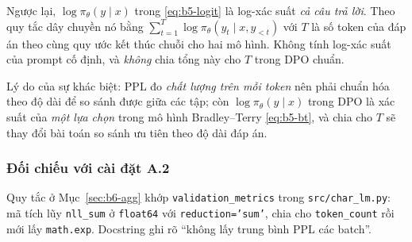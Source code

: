 Ngược lại, $\log\pi_\theta(y\mid x)$ trong \eqref{eq:b5-logit} là log-xác suất
\emph{cả câu trả lời}. Theo quy tắc dây chuyền nó bằng
$\sum_{t=1}^{T}\log\pi_\theta(y_t\mid x,y_{<t})$ với $T$ là số token của đáp án
theo cùng quy ước kết thúc chuỗi cho hai mô hình. Không tính log-xác suất của prompt
cố định, và \emph{không} chia tổng này cho $T$ trong DPO chuẩn.

Lý do của sự khác biệt: PPL đo \emph{chất lượng trên mỗi token} nên phải chuẩn hóa
theo độ dài để so sánh được giữa các tập; còn $\log\pi_\theta(y\mid x)$ trong DPO
là xác suất của \emph{một lựa chọn} trong mô hình Bradley--Terry
\eqref{eq:b5-bt}, và chia cho $T$ sẽ thay đổi bài toán so sánh ưu tiên theo độ dài
đáp án.

\subsubsection{Đối chiếu với cài đặt A.2}

Quy tắc ở Mục~\ref{sec:b6-agg} khớp \texttt{validation\_metrics} trong
\texttt{src/char\_lm.py}: mã tích lũy \texttt{nll\_sum} ở \texttt{float64} với
\texttt{reduction='sum'}, chia cho \texttt{token\_count} rồi mới lấy
\texttt{math.exp}. Docstring ghi rõ ``không lấy trung bình PPL các batch''.
